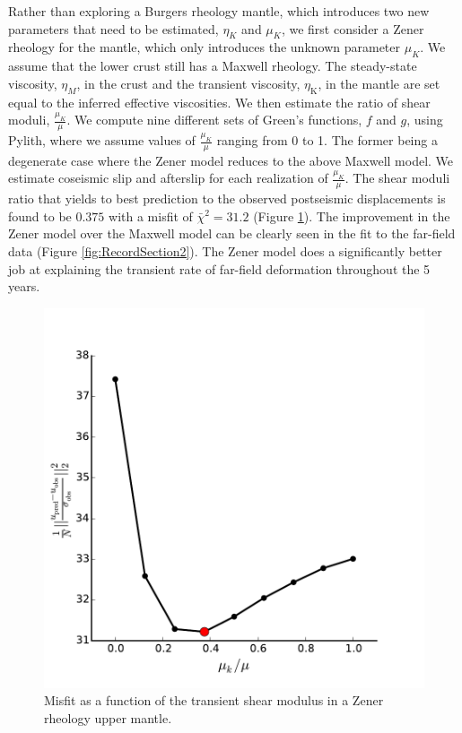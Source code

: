 \documentclass[review]{elsarticle}
\begin{document}
Rather than exploring a Burgers rheology mantle, which introduces two new parameters that need to be estimated, $\eta_{K}$ and $\mu_{K}$, we first consider a Zener rheology for the mantle, which only introduces the unknown parameter $\mu_{K}$.  We assume that the lower crust still has a Maxwell rheology. The steady-state viscosity, $\eta_{M}$, in the crust and the transient viscosity, $\eta_\mathrm{K}$, in the mantle are set equal to the inferred effective viscosities.  We then estimate the ratio of shear moduli, $\frac{\mu_K}{\mu}$. We compute nine different sets of Green's functions, $f$ and $g$, using Pylith, where we assume values of $\frac{\mu_K}{\mu}$ ranging from 0 to 1. The former being a degenerate case where the Zener model reduces to the above Maxwell model.  We estimate coseismic slip and afterslip for each realization of $\frac{\mu_K}{\mu}$.  The shear moduli ratio that yields to best prediction to the observed postseismic displacements is found to be $0.375$ with a misfit of $\bar\chi^2=31.2$ (Figure \ref{fig:ShearModulusRatio}).  The improvement in the Zener model over the Maxwell model can be clearly seen in the fit to the far-field data (Figure \ref{fig:RecordSection2}). The Zener model does a significantly better job at explaining the transient rate of far-field deformation throughout the 5 years.  

\begin{figure}
\includegraphics[scale=0.8]{Figures/RatioMisfit}
\centering 
\caption{Misfit as a function of the transient shear modulus in a Zener rheology upper mantle.}
\label{fig:ShearModulusRatio}
\end{figure}
\end{document}
